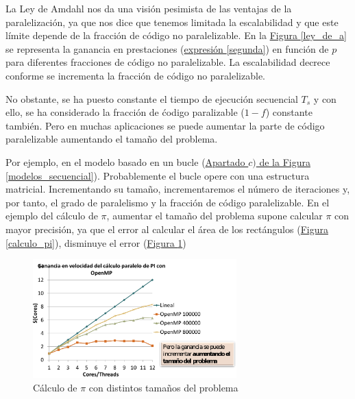 \documentclass[10pt,a4paper,spanish]{report}
\begin{document}
La Ley de Amdahl nos da una visión pesimista de las ventajas de la paralelización, ya que nos dice que tenemos limitada la escalabilidad y que este límite depende de la fracción de código no paralelizable. En la \hyperref[ley_de_a]{Figura \ref*{ley_de_a}} se representa la ganancia en prestaciones (\hyperref[segunda]{expresión \ref*{segunda}}) en función de $p$ para diferentes fracciones de código no paralelizable. La escalabilidad decrece conforme se incrementa la fracción de código no paralelizable.

No obstante, se ha puesto constante el tiempo de ejecución secuencial $T_s$ y con ello, se ha considerado la fracción de ćodigo paralizable ($1-f$) constante también. Pero en muchas aplicaciones se puede aumentar la parte de código paralelizable aumentando el tamaño del problema.

Por ejemplo, en el modelo basado en un bucle (\hyperref[modelos_secuencial]{Apartado $c)$ de la Figura \ref*{modelos_secuencial}}). Probablemente el bucle opere con una estructura matricial. Incrementando su tamaño, incrementaremos el número de iteraciones y, por tanto, el grado de paralelismo y la fracción de código paralelizable.  En el ejemplo del cálculo de $\pi$, aumentar el tamaño del problema supone calcular $\pi$ con mayor precisión, ya que el error al calcular el área de los rectángulos (\hyperref[calculo_pi]{Figura \ref*{calculo_pi}}), disminuye el error (\hyperref[ganancia_pi]{Figura \ref*{ganancia_pi}})

\begin{figure}[!h]
\centering
\includegraphics[width=0.7\textwidth]{51}
\caption{Cálculo de $\pi$ con distintos tamaños del problema}
\label{ganancia_pi}
\end{figure}
\end{document}
